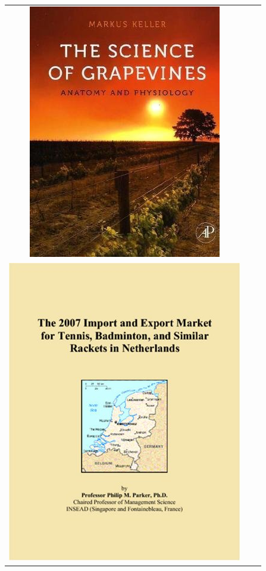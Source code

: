 \documentclass[conference]{IEEEtran}
\begin{document}
\begin{table}[hbtp]
\begin{center}
\begin{tabular}{c c c}
  \includegraphics[scale=0.2]{pics/non_results_images/science.jpeg} \\
  \includegraphics[scale=0.2]{pics/non_results_images/sports.jpeg} &

\end{tabular}
\end{center}
\end{table}
\end{document}
